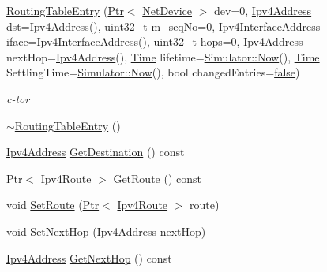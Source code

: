\begin{DoxyCompactItemize}
\item 
\hyperlink{classns3_1_1dsdv_1_1RoutingTableEntry_a4645b9161eb6547a2d885ff593d2cf77}{Routing\+Table\+Entry} (\hyperlink{classns3_1_1Ptr}{Ptr}$<$ \hyperlink{classns3_1_1NetDevice}{Net\+Device} $>$ dev=0, \hyperlink{classns3_1_1Ipv4Address}{Ipv4\+Address} dst=\hyperlink{classns3_1_1Ipv4Address}{Ipv4\+Address}(), uint32\+\_\+t \hyperlink{classns3_1_1dsdv_1_1RoutingTableEntry_a17e9ec058eb434fa4caae105a44756af}{m\+\_\+seq\+No}=0, \hyperlink{classns3_1_1Ipv4InterfaceAddress}{Ipv4\+Interface\+Address} iface=\hyperlink{classns3_1_1Ipv4InterfaceAddress}{Ipv4\+Interface\+Address}(), uint32\+\_\+t hops=0, \hyperlink{classns3_1_1Ipv4Address}{Ipv4\+Address} next\+Hop=\hyperlink{classns3_1_1Ipv4Address}{Ipv4\+Address}(), \hyperlink{classns3_1_1Time}{Time} lifetime=\hyperlink{classns3_1_1Simulator_ac3178fa975b419f7875e7105be122800}{Simulator\+::\+Now}(), \hyperlink{classns3_1_1Time}{Time} Settling\+Time=\hyperlink{classns3_1_1Simulator_ac3178fa975b419f7875e7105be122800}{Simulator\+::\+Now}(), bool changed\+Entries=\hyperlink{lte__cqi__generation_8m_ab1bef239d413c4da139c4bac92cd657a}{false})
\begin{DoxyCompactList}\small\item\em c-\/tor \end{DoxyCompactList}\item 
\hyperlink{classns3_1_1dsdv_1_1RoutingTableEntry_a7ed10b4dc6bfc982a342bc52eff7c7ce}{$\sim$\+Routing\+Table\+Entry} ()
\item 
\hyperlink{classns3_1_1Ipv4Address}{Ipv4\+Address} \hyperlink{classns3_1_1dsdv_1_1RoutingTableEntry_accce1ae13754a9cfca9be827eb33e113}{Get\+Destination} () const 
\item 
\hyperlink{classns3_1_1Ptr}{Ptr}$<$ \hyperlink{classns3_1_1Ipv4Route}{Ipv4\+Route} $>$ \hyperlink{classns3_1_1dsdv_1_1RoutingTableEntry_a15b0764630371199da3173a7d08808ec}{Get\+Route} () const 
\item 
void \hyperlink{classns3_1_1dsdv_1_1RoutingTableEntry_a87275f1559cf237ff6306e2dbc656767}{Set\+Route} (\hyperlink{classns3_1_1Ptr}{Ptr}$<$ \hyperlink{classns3_1_1Ipv4Route}{Ipv4\+Route} $>$ route)
\item 
void \hyperlink{classns3_1_1dsdv_1_1RoutingTableEntry_a83def481b5c613a42880a3d0b85940c7}{Set\+Next\+Hop} (\hyperlink{classns3_1_1Ipv4Address}{Ipv4\+Address} next\+Hop)
\item 
\hyperlink{classns3_1_1Ipv4Address}{Ipv4\+Address} \hyperlink{classns3_1_1dsdv_1_1RoutingTableEntry_a961a9f25f1bd7b70c661c37751a0f327}{Get\+Next\+Hop} () const 

\end{DoxyCompactItemize}
